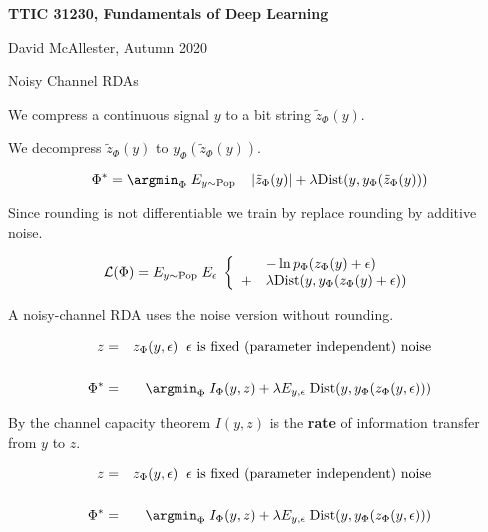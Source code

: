 





{\Huge

  \centerline{\bf TTIC 31230, Fundamentals of Deep Learning}
  \bigskip
  \centerline{David McAllester, Autumn 2020}
  \vfill
  \centerline{Noisy Channel RDAs}
  \vfill
  \vfill



We compress a continuous signal $y$ to a bit string $\tilde{z}_\Phi(y)$.

\vfill
We decompress $\tilde{z}_\Phi(y)$ to $y_\Phi(\tilde{z}_\Phi(y))$.

\vfill
{\color{red} $$\Phi^* = \argmin_\Phi\; E_{y \sim \mathrm{Pop}}\;\;\;\;|\tilde{z}_\Phi(y)| + \lambda \mathrm{Dist}(y,y_\Phi(\tilde{z}_\Phi(y)))$$}


Since rounding is not differentiable we train by replace rounding by additive noise.

\vfill

\vfill
{\color{red} $${\cal L}(\Phi) = E_{y \sim \mathrm{Pop}}\;E_\epsilon \;\left\{\begin{array}{ll} &- \ln p_\Phi(z_\Phi(y) + \epsilon) \\
+ & \lambda \mathrm{Dist}(y,y_\Phi(z_\Phi(y) + \epsilon)) \end{array}\right.$$}

\vfill
A noisy-channel RDA uses the noise version without rounding.


\bigskip
\bigskip
\begin{eqnarray*}
z & = & z_\Phi(y,\epsilon) \;\;\mbox{$\epsilon$ is fixed (parameter independent) noise} \\
\\
\Phi^* & = & \argmin_\Phi \;I_\Phi(y,z) + \lambda E_{y,\epsilon}\; \mathrm{Dist}(y,y_\Phi(z_\Phi(y,\epsilon)))
\end{eqnarray*}

\bigskip
By the channel capacity theorem {\color{red} $I(y,z)$} is the {\bf rate} of information transfer from $y$ to $z$.


\bigskip
\bigskip
\begin{eqnarray*}
z & = & z_\Phi(y,\epsilon) \;\;\mbox{$\epsilon$ is fixed (parameter independent) noise} \\
\\
\Phi^* & = & \argmin_\Phi \;I_\Phi(y,z) + \lambda E_{y,\epsilon}\; \mathrm{Dist}(y,y_\Phi(z_\Phi(y,\epsilon)))
\end{eqnarray*}
        
}

